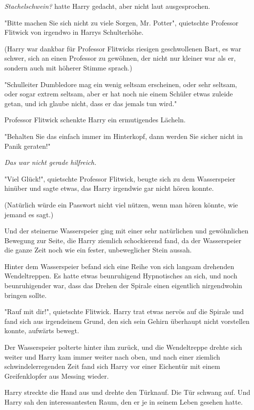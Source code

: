 {\emph{Stachelschwein?} hatte Harry gedacht, aber nicht laut ausgesprochen.

"Bitte machen Sie sich nicht zu viele Sorgen, Mr. Potter", quietschte Professor Flitwick von irgendwo in Harrys Schulterhöhe.

(Harry war dankbar für Professor Flitwicks riesigen geschwollenen Bart, es war schwer, sich an einen Professor zu gewöhnen, der nicht nur kleiner war als er, sondern auch mit höherer Stimme sprach.)

"Schulleiter Dumbledore mag ein wenig seltsam erscheinen, oder sehr seltsam, oder sogar extrem seltsam, aber er hat noch nie einem Schüler etwas zuleide getan, und ich glaube nicht, dass er das jemals tun wird."

Professor Flitwick schenkte Harry ein ermutigendes Lächeln.

"Behalten Sie das einfach immer im Hinterkopf, dann werden Sie sicher nicht in Panik geraten!"

\emph{Das war nicht gerade hilfreich.}

"Viel Glück!", quietschte Professor Flitwick, beugte sich zu dem Wasserspeier hinüber und sagte etwas, das Harry irgendwie gar nicht hören konnte.

(Natürlich würde ein Passwort nicht viel nützen, wenn man hören könnte, wie jemand es sagt.)

Und der steinerne Wasserspeier ging mit einer sehr natürlichen und gewöhnlichen Bewegung zur Seite, die Harry ziemlich schockierend fand, da der Wasserspeier die ganze Zeit noch wie ein fester, unbeweglicher Stein aussah.

Hinter dem Wasserspeier befand sich eine Reihe von sich langsam drehenden Wendeltreppen. Es hatte etwas beunruhigend Hypnotisches an sich, und noch beunruhigender war, dass das Drehen der Spirale einen eigentlich nirgendwohin bringen sollte.

"Rauf mit dir!", quietschte Flitwick. Harry trat etwas nervös auf die Spirale und fand sich aus irgendeinem Grund, den sich sein Gehirn überhaupt nicht vorstellen konnte, aufwärts bewegt.

Der Wasserspeier polterte hinter ihm zurück, und die Wendeltreppe drehte sich weiter und Harry kam immer weiter nach oben, und nach einer ziemlich schwindelerregenden Zeit fand sich Harry vor einer Eichentür mit einem Greifenklopfer aus Messing wieder.

Harry streckte die Hand aus und drehte den Türknauf. Die Tür schwang auf. Und Harry sah den interessantesten Raum, den er je in seinem Leben gesehen hatte.

}
